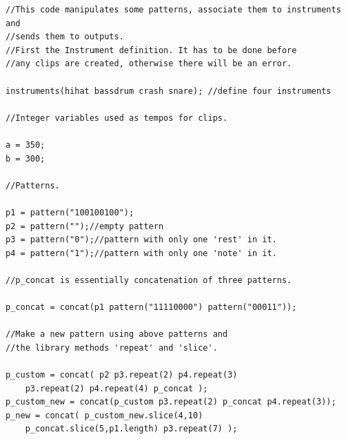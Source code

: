\begin{verbatim}
//This code manipulates some patterns, associate them to instruments and
//sends them to outputs.
//First the Instrument definition. It has to be done before 
//any clips are created, otherwise there will be an error.

instruments(hihat bassdrum crash snare); //define four instruments

//Integer variables used as tempos for clips.

a = 350;
b = 300;

//Patterns.

p1 = pattern("100100100");
p2 = pattern("");//empty pattern
p3 = pattern("0");//pattern with only one 'rest' in it.
p4 = pattern("1");//pattern with only one 'note' in it.

//p_concat is essentially concatenation of three patterns.

p_concat = concat(p1 pattern("11110000") pattern("00011"));

//Make a new pattern using above patterns and 
//the library methods 'repeat' and 'slice'. 

p_custom = concat( p2 p3.repeat(2) p4.repeat(3) 
    p3.repeat(2) p4.repeat(4) p_concat );
p_custom_new = concat(p_custom p3.repeat(2) p_concat p4.repeat(3));
p_new = concat( p_custom_new.slice(4,10) 
    p_concat.slice(5,p1.length) p3.repeat(7) );

\end{verbatim}
\clearpage
